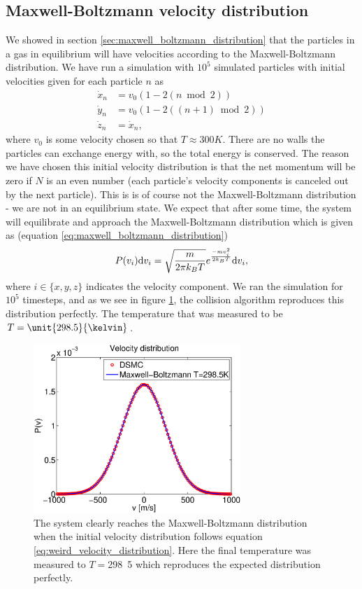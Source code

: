 \subsection{Maxwell-Boltzmann velocity distribution}
We showed in section \ref{sec:maxwell_boltzmann_distribution} that the particles in a gas in equilibrium will have velocities according to the Maxwell-Boltzmann distribution. We have run a simulation with $10^5$ simulated particles with initial velocities given for each particle $n$ as
\begin{align}
	\nonumber
	\dot x_n &= v_0(1 - 2 (n\bmod 2))\\
	\label{eq:weird_velocity_distribution}
	\dot y_n &= v_0(1 - 2 ((n+1)\bmod 2))\\
	\nonumber
	\dot z_n &= \dot x_n,
\end{align}
where $v_0$ is some velocity chosen so that $T\approx 300K$. There are no walls the particles can exchange energy with, so the total energy is conserved. The reason we have chosen this initial velocity distribution is that the net momentum will be zero if $N$ is an even number (each particle's velocity components is canceled out by the next particle). This is is of course not the Maxwell-Boltzmann distribution - we are not in an equilibrium state. We expect that after some time, the system will equilibrate and approach the Maxwell-Boltzmann distribution which is given as (equation \eqref{eq:maxwell_boltzmann_distribution})
\begin{align}
	P(v_i)\mathrm{d}v_i = \sqrt\frac{m}{2\pi k_BT}e^{-mv_i^2\over 2k_BT}\mathrm{d}v_i,
\end{align}
where $i\in \{x,y,z\}$ indicates the velocity component. We ran the simulation for $10^5$ timesteps, and as we see in figure \ref{fig:velocity_distribution}, the collision algorithm reproduces this distribution perfectly. The temperature that was measured to be $T=\unit{298.5}{\kelvin}$.
\begin{figure}[htb]
\begin{center}
\includegraphics[width=0.7\textwidth, trim=0cm 0cm 0cm 0cm, clip]{DSMC/figures/velocity_distribution.eps}
\end{center}
\caption{The system clearly reaches the Maxwell-Boltzmann distribution when the initial velocity distribution follows equation \ref{eq:weird_velocity_distribution}. Here the final temperature was measured to $T =$\unit{298.5}{\kelvin} which reproduces the expected distribution perfectly.}
\label{fig:velocity_distribution}
\end{figure}

